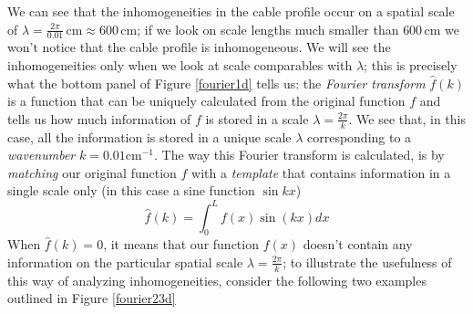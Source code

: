 We can see that the inhomogeneities in the cable profile occur on a spatial scale of $\lambda=\frac{2\pi}{0.01}\,\mathrm{cm}\approx 600\,\mathrm{cm}$; if we look on scale lengths much smaller than $600$\,cm we won't notice that the cable profile is inhomogeneous. We will see the inhomogeneities only when we look at scale comparables with $\lambda$; this is precisely what the bottom panel of Figure \ref{fourier1d} tells us: the \textit{Fourier transform} $\hat{f}(k)$ is a function that can be uniquely calculated from the original function $f$ and tells us how much information of $f$ is stored in a scale $\lambda=\frac{2\pi}{k}$. We see that, in this case, all the information is stored in a unique scale $\lambda$ corresponding to a \textit{wavenumber} $k=0.01\mathrm{cm}^{-1}$. The way this Fourier transform is calculated, is by \textit{matching} our original function $f$ with a \textit{template} that contains information in a single scale only (in this case a sine function $\sin{kx}$) 
\begin{equation}
\label{trasf1d}
\hat{f}(k)=\int_0^Lf(x)\sin{(kx)}dx
\end{equation}
When $\hat{f}(k)=0$, it means that our function $f(x)$ doesn't contain any information on the particular spatial scale $\lambda=\frac{2\pi}{k}$; to illustrate the usefulness of this way of analyzing inhomogeneities, consider the following two examples outlined in Figure \ref{fourier23d}
